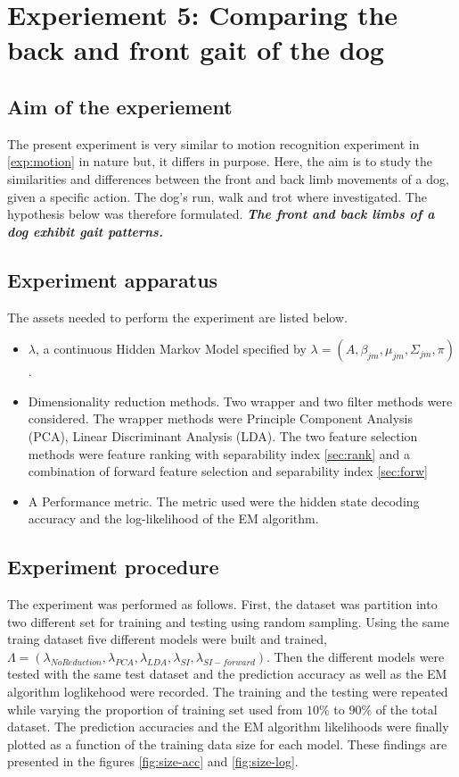 \newpage
\section{Experiement 5: Comparing the back and front gait of the dog}  \label{exp:front-back}

\subsection{Aim of the experiement}
The present experiment is very similar to motion recognition experiment in \ref{exp:motion} in nature but, it differs in purpose. Here, the aim is to study the similarities and differences between the front and back limb movements of a dog, given a specific action. The dog's run, walk and trot where investigated.
The hypothesis below was therefore formulated.
\textbf{\textit{The front and back limbs of a dog exhibit gait patterns.}}

\subsection{Experiment apparatus}
The assets needed to perform the experiment are listed below.
\begin{itemize}
	\item \(\lambda\), a continuous Hidden Markov Model specified by \(\lambda = (A, \beta_{jm}, \mu_{jm}, \Sigma_{jm}, \pi)\).
	\item Dimensionality reduction methods. Two wrapper and two filter methods were considered. The wrapper methods were Principle Component Analysis (PCA), Linear Discriminant Analysis (LDA). The two feature selection methods were feature ranking with separability index \ref{sec:rank}
	and a combination of forward feature selection and separability index \ref{sec:forw}
	\item A Performance metric. The metric used were the hidden state decoding accuracy and the log-likelihood of the EM algorithm.
\end{itemize}

\subsection{Experiment procedure}
The experiment was performed as follows.
First, the dataset was partition into two different set for training and testing using random sampling.
Using the same traing dataset five different models were built and trained, \(\Lambda = (\lambda_{No Reduction}, \lambda_{PCA}, \lambda_{LDA}, \lambda_{SI}, \lambda_{SI-forward})\).
Then the different models were tested with the same test dataset and the prediction accuracy as well as the EM algorithm loglikehood were recorded.
The training and the testing were repeated while varying the proportion of training set used from \(10\%\) to \(90\%\) of the total dataset.
The prediction accuracies and the EM algorithm likelihoods were finally plotted as a function of the training data size for each model.
These findings are presented in the figures \ref{fig:size-acc} and \ref{fig:size-log}. 

